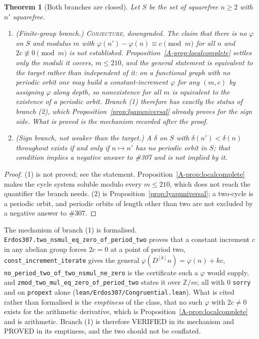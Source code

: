 \documentclass[11pt]{article}
\newtheorem{theorem}{Theorem}[section]
\theoremstyle{definition}
\begin{document}
\begin{theorem}[Both branches are closed]\label{thm:noinvariant}
Let $S$ be the set of squarefree $n\ge2$ with $n'$ squarefree.
\begin{enumerate}[label=\textup{(\arabic*)},leftmargin=2.2em]
\item \textup{(Finite-group branch.)} \textsc{Conjecture}, downgraded. The claim that there is no
$\varphi$ on $S$ and modulus $m$ with $\varphi(n')-\varphi(n)\equiv c\pmod m$ for all $n$ and
$2c\not\equiv0\pmod m$ is \emph{not} established. Proposition~\ref{A-prop:localcomplete} settles only
the moduli it covers, $m\le210$, and the general statement is equivalent to the target rather than
independent of it: on a functional graph with no periodic orbit one may build a constant-increment
$\varphi$ for any $(m,c)$ by assigning $\varphi$ along depth, so nonexistence for all $m$ is
equivalent to the existence of a periodic orbit. Branch (1) therefore has exactly the status of
branch (2), which Proposition~\ref{prop:lyapuniversal} already proves for the sign side. What is
proved is the mechanism recorded after the proof.
\item \textup{(Sign branch, not weaker than the target.)} A $\delta$ on $S$ with
$\delta(n')<\delta(n)$ throughout exists if and only if $n\mapsto n'$ has no periodic orbit in $S$;
that condition implies a negative answer to \#307 and is not implied by it.
\end{enumerate}
\end{theorem}
\begin{proof}
(1) is not proved; see the statement. Proposition~\ref{A-prop:localcomplete} makes the cycle system
soluble modulo every $m\le210$, which does not reach the quantifier the branch needs.
(2) is Proposition~\ref{prop:lyapuniversal}; a two-cycle is a periodic orbit, and periodic orbits of
length other than two are not excluded by a negative answer to \#307.
\end{proof}

The mechanism of branch (1) is formalised. \texttt{Erdos307.two\_nsmul\_eq\_zero\_of\_period\_two}
proves that a constant increment $c$ in any abelian group forces $2c=0$ at a point of period two,
\texttt{const\_increment\_iterate} gives the general $\varphi(D^{[k]}n)=\varphi(n)+kc$,
\texttt{no\_period\_two\_of\_two\_nsmul\_ne\_zero} is the certificate such a $\varphi$ would supply,
and \texttt{zmod\_two\_mul\_eq\_zero\_of\_period\_two} states it over $\mathbb{Z}/m$; all with $0$
\texttt{sorry} and on \texttt{propext} alone
\textup{(\texttt{lean/Erdos307/Congruential.lean})}. What is cited rather than formalised is the
\emph{emptiness} of the class, that no such $\varphi$ with $2c\neq0$ exists for the arithmetic
derivative, which is Proposition~\ref{A-prop:localcomplete} and is arithmetic. Branch (1) is therefore
\textup{VERIFIED} in its mechanism and \textup{PROVED} in its emptiness, and the two should not be
conflated.
\end{document}
